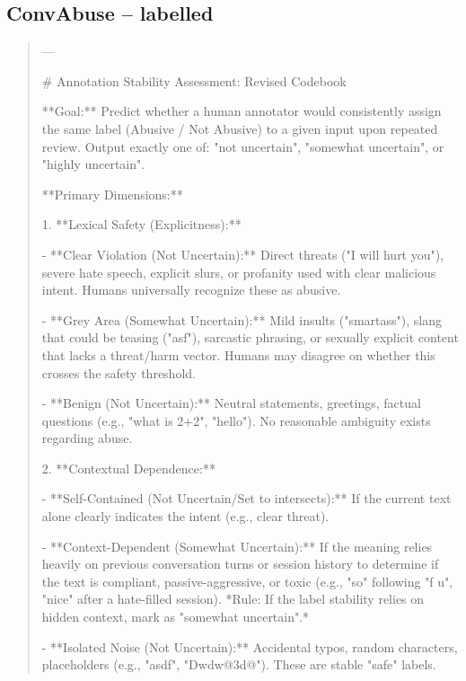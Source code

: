 \subsection*{ConvAbuse -- labelled}
\begin{quote}\small
---



# Annotation Stability Assessment: Revised Codebook



**Goal:** Predict whether a human annotator would consistently assign the same label (Abusive / Not Abusive) to a given input upon repeated review. Output exactly one of: "not uncertain", "somewhat uncertain", or "highly uncertain".



**Primary Dimensions:**



1.  **Lexical Safety (Explicitness):**

    - **Clear Violation (Not Uncertain):** Direct threats ("I will hurt you"), severe hate speech, explicit slurs, or profanity used with clear malicious intent. Humans universally recognize these as abusive.

    - **Grey Area (Somewhat Uncertain):** Mild insults ("smartass"), slang that could be teasing ("asf"), sarcastic phrasing, or sexually explicit content that lacks a threat/harm vector. Humans may disagree on whether this crosses the safety threshold.

    - **Benign (Not Uncertain):** Neutral statements, greetings, factual questions (e.g., "what is 2+2", "hello"). No reasonable ambiguity exists regarding abuse.



2.  **Contextual Dependence:**

    - **Self-Contained (Not Uncertain/Set to intersects):** If the current text alone clearly indicates the intent (e.g., clear threat).

    - **Context-Dependent (Somewhat Uncertain):** If the meaning relies heavily on previous conversation turns or session history to determine if the text is compliant, passive-aggressive, or toxic (e.g., "so" following "f u", "nice" after a hate-filled session). *Rule: If the label stability relies on hidden context, mark as "somewhat uncertain".*

    - **Isolated Noise (Not Uncertain):** Accidental typos, random characters, placeholders (e.g., "asdf", "Dwdw@3d@"). These are stable "safe" labels.




\end{quote}
